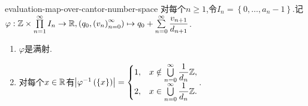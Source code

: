 \begin{proposition}{}{evaluation-map-over-cantor-number-space}
	对每个$n\geq 1$,令$I_{n}=\left\{0,\ldots,a_{n}-1\right\}$.记$\varphi:\mathbb{Z}\times\prod\limits_{n=1}^{\infty}I_{n}\to\mathbb{R},\left(q_{0},\left(v_{n}\right)_{n=0}^{\infty}\right)\mapsto q_{0}+\sum\limits_{n=0}^{\infty}\dfrac{v_{n+1}}{d_{n+1}}$.
	\begin{enumerate}
		\item $\varphi$是满射.
		\item 对每个$x\in\mathbb{R}$有$\left|\varphi^{-1}\left(\left\{x\right\}\right)\right|=
		\begin{cases}
			1,&x\notin\bigcup\limits_{n=0}^{\infty}\dfrac{1}{d_{n}}\mathbb{Z},\\
			2,&x\in\bigcup\limits_{n=0}^{\infty}\dfrac{1}{d_{n}}\mathbb{Z}.
		\end{cases}$.
	\end{enumerate}
\end{proposition}







